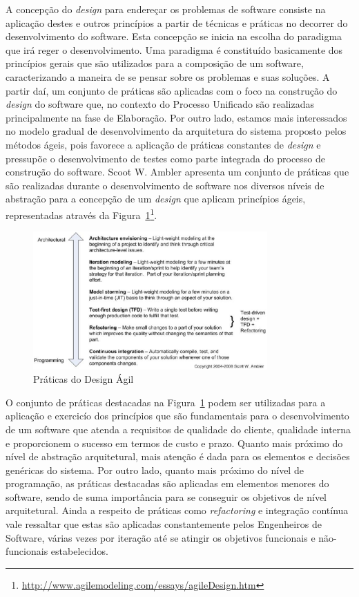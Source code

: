 %

A concepção do \emph{design} para endereçar os problemas de software consiste na aplicação destes e outros princípios a partir de técnicas e práticas no decorrer do desenvolvimento do software. Esta concepção se inicia na escolha do paradigma que irá reger o desenvolvimento. Uma paradigma é constituído basicamente dos princípios gerais que são utilizados para a composição de um software, caracterizando a maneira de se pensar sobre os problemas e suas soluções. A partir daí, um conjunto de práticas são aplicadas com o foco na construção do \emph{design} do software que, no contexto do Processo Unificado são realizadas principalmente na fase de Elaboração. Por outro lado, estamos mais interessados no modelo gradual de desenvolvimento da arquitetura do sistema proposto pelos métodos ágeis, pois favorece a aplicação de práticas constantes de \emph{design} e pressupõe o desenvolvimento de testes como parte integrada do processo de construção do software. Scoot W. Ambler apresenta um conjunto de práticas que são realizadas durante o desenvolvimento de software nos diversos níveis de abstração para a concepção de um \emph{design} que aplicam princípios ágeis, representadas através da Figura~\ref{fig:agile-design}\footnote{\url{http://www.agilemodeling.com/essays/agileDesign.htm}}.

%

\graphicspath{{figuras/}}
\begin{figure}[h]
\centering
\includegraphics[width=0.8\textwidth]{agile_design_practices.eps}
\caption{Práticas do Design Ágil}
\label{fig:agile-design}
\end{figure}

%

O conjunto de práticas destacadas na Figura~\ref{fig:agile-design} podem ser utilizadas para a aplicação e exercicío dos princípios que são fundamentais para o desenvolvimento de um software que atenda a requisitos de qualidade do cliente, qualidade interna e proporcionem o sucesso em termos de custo e prazo. Quanto mais próximo do nível de abstração arquitetural, mais atenção é dada para os elementos e decisões genéricas do sistema. Por outro lado, quanto mais próximo do nível de programação, as práticas destacadas são aplicadas em elementos menores do software, sendo de suma importância para se conseguir os objetivos de nível arquitetural. Ainda a respeito de práticas como \emph{refactoring} e integração contínua vale ressaltar que estas são aplicadas constantemente pelos Engenheiros de Software, várias vezes por iteração até se atingir os objetivos funcionais e não-funcionais estabelecidos.

